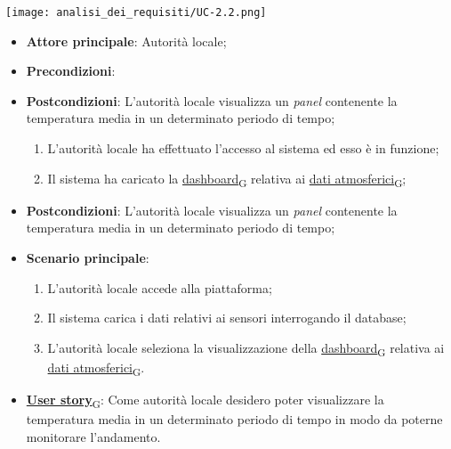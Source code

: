 \begin{center}
	\texttt{[image: analisi\_dei\_requisiti/UC-2.2.png]}
\end{center}

\begin{itemize}
	\item \textbf{Attore principale}: Autorità locale;
	\item \textbf{Precondizioni}: 	\item \textbf{Postcondizioni}: L'autorità locale visualizza un \textit{panel} contenente la temperatura media in un determinato periodo di tempo;
	      \begin{enumerate}
		      \item L'autorità locale ha effettuato l'accesso al sistema ed esso è in funzione;
		      \item Il sistema ha caricato la \href{https://7last.github.io/docs/rtb/documentazione-interna/glossario\#dashboard}{dashboard\textsubscript{G}} relativa ai \href{https://7last.github.io/docs/rtb/documentazione-interna/glossario\#dati-atmosferici}{dati atmosferici\textsubscript{G}};
	      \end{enumerate}
	\item \textbf{Postcondizioni}: L'autorità locale visualizza un \textit{panel} contenente la temperatura media in un determinato periodo di tempo;
	\item \textbf{Scenario principale}:
	      \begin{enumerate}
		      \item L'autorità locale accede alla piattaforma;
		      \item Il sistema carica i dati relativi ai sensori interrogando il database;
		      \item L'autorità locale seleziona la visualizzazione della \href{https://7last.github.io/docs/rtb/documentazione-interna/glossario\#dashboard}{dashboard\textsubscript{G}} relativa ai \href{https://7last.github.io/docs/rtb/documentazione-interna/glossario\#dati-atmosferici}{dati atmosferici\textsubscript{G}}.
	      \end{enumerate}
	\item \href{https://7last.github.io/docs/rtb/documentazione-interna/glossario\#user-story}{\textbf{User story}\textsubscript{G}}: Come autorità locale desidero poter visualizzare la temperatura media in un determinato periodo di tempo
	      in modo da poterne monitorare l'andamento.
\end{itemize}

